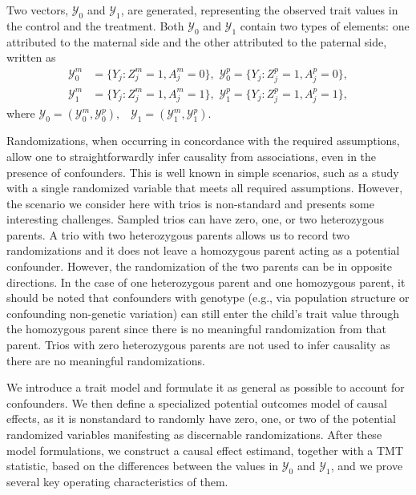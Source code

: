 \documentclass[12pt]{extarticle}
\begin{document}
Two vectors, $\boldsymbol{\mathcal{Y}}_0$ and $\boldsymbol{\mathcal{Y}}_1$, are generated, representing the observed trait values in the control and the treatment. Both $\boldsymbol{\mathcal{Y}}_0$ and $\boldsymbol{\mathcal{Y}}_1$ contain two types of elements: one attributed to the maternal side and the other attributed to the paternal side, written as  
\begin{align*}
\boldsymbol{\mathcal{Y}}_0^m &=\{Y_j:Z_{j}^m=1,A_{j}^m=0\},\,\,\boldsymbol{\mathcal{Y}}_0^p=\{Y_j:Z_{j}^p=1,A_{j}^p=0\}, \\
\boldsymbol{\mathcal{Y}}_1^m &=\{Y_j:Z_{j}^m=1,A_{j}^m=1\},\,\,\boldsymbol{\mathcal{Y}}_1^p=\{Y_j:Z_{j}^p=1,A_{j}^p=1\},
\end{align*} 
 where $\boldsymbol{\mathcal{Y}}_0=(\boldsymbol{\mathcal{Y}}_0^m,\boldsymbol{\mathcal{Y}}_0^p),\,\,\,\,\, \boldsymbol{\mathcal{Y}}_1=(\boldsymbol{\mathcal{Y}}_1^m,\boldsymbol{\mathcal{Y}}_1^p)$. 

Randomizations, when occurring in concordance with the required assumptions, allow one to straightforwardly infer causality from associations, even in the presence of confounders. This is well known in simple scenarios, such as a study with a single randomized variable that meets all required assumptions. However, the scenario we consider here with trios is non-standard and presents some interesting challenges.  Sampled trios can have zero, one, or two heterozygous parents. A trio with two heterozygous parents allows us to record two randomizations and it does not leave a homozygous parent acting as a potential confounder. However, the randomization of the two parents can be in opposite directions. In the case of one heterozygous parent and one homozygous parent, it should be noted that confounders with genotype (e.g., via population structure or confounding non-genetic variation) can still enter the child's trait value through the homozygous parent since there is no meaningful randomization from that parent. Trios with zero heterozygous parents are not used to infer causality as there are no meaningful randomizations. 

We introduce a trait model and formulate it as general as possible to account for confounders. We then define a specialized potential outcomes model of causal effects, as it is nonstandard to randomly have zero, one, or two of the potential randomized variables manifesting as discernable randomizations. After these model formulations, we construct a causal effect estimand, together with a TMT statistic, based on the differences between the values in $\boldsymbol{\mathcal{Y}}_0$ and $\boldsymbol{\mathcal{Y}}_1$, and we prove several key operating characteristics of them. 
\end{document}
